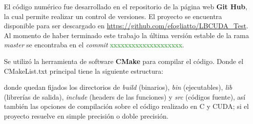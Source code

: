 El código numérico fue desarrollado en el repositorio de la página web \textbf{Git Hub}, la cual permite realizar un control de versiones. El proyecto se encuentra disponible para ser descargado en \url{https://github.com/efogliatto/LBCUDA_Test}. Al momento de haber terminado este trabajo la última versión estable de la rama \textit{master} se encontraba en el \textit{commit} \textcolor{green}{xxxxxxxxxxxxxxxxxxxx}.

Se utilizó la herramienta de software \textbf{CMake} para compilar el código. Donde el CMakeList.txt principal tiene la siguiente estructura: 


donde quedan fijados los directorios de \textit{build} (binarios), \textit{bin} (ejecutables), \textit{lib} (librerías de salida), \textit{include} (headers de las funciones) y \textit{src} (códigos fuente), así también las opciones de compilación sobre el código realizado en C y CUDA; si el proyecto resuelve en simple precisión o doble precisión.





